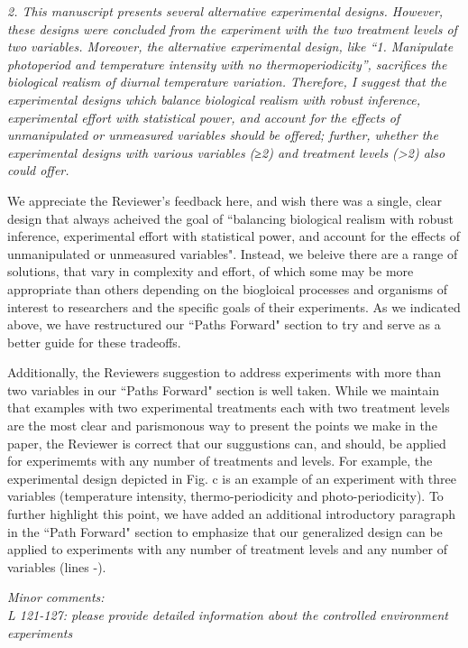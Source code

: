 \documentclass[11pt]{article}
\begin{document}
\emph{2. This manuscript presents several alternative experimental designs. However, these designs were concluded from the experiment with the two treatment levels of two variables. Moreover, the alternative experimental design, like “1. Manipulate photoperiod and temperature intensity with no thermoperiodicity”, sacrifices the biological realism of diurnal temperature variation. Therefore, I suggest that the experimental designs which balance biological realism with robust inference, experimental effort with statistical power, and account for the effects of unmanipulated or unmeasured variables should be offered; further, whether the experimental designs with various variables (≥2) and treatment levels (>2) also could offer.}

We appreciate the Reviewer's feedback here, and wish there was a single, clear design that always acheived the goal of ``balancing biological realism with robust inference, experimental effort with statistical power, and account for the effects of unmanipulated or unmeasured variables". Instead, we beleive there are a range of solutions, that vary in complexity and effort, of which some may be more appropriate than others depending on the biogloical processes and organisms of interest to researchers and the specific goals of their experiments. As we indicated above, we have restructured our ``Paths Forward" section to try and serve as a better guide for these tradeoffs.

Additionally, the Reviewers suggestion to address experiments with more than two variables in our ``Paths Forward" section is well taken. While we maintain that examples with two experimental treatments each with two treatment levels are the most clear and parismonous way to present the points we make in the paper, the Reviewer is correct that our suggustions can, and should, be applied for experimemts with any number of treatments and levels. For example, the experimental design depicted in Fig. \label{fig:designs}c is an example of an experiment with three variables (temperature intensity, thermo-periodicity and photo-periodicity). To further highlight this point, we have added an additional introductory paragraph in the ``Path Forward" section  to emphasize that our generalized design can be applied to experiments with any number of treatment levels and any number of variables (lines -).

\emph{Minor comments:}\\

\emph{L 121-127: please provide detailed information about the controlled environment experiments}
\end{document}
